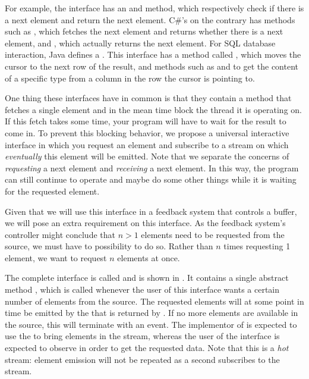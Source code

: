 For example, the \itr interface has an  and  method, which respectively check if there is a next element and return the next element. C\#'s \ier on the contrary has methods such as , which fetches the next element and returns whether there is a next element, and , which actually returns the next element. For SQL database interaction, Java defines a . This interface has a method called , which moves the cursor to the next row of the result, and methods such as  and  to get the content of a specific type from a column in the row the cursor is pointing to.

One thing these interfaces have in common is that they contain a method that fetches a single element and in the mean time block the thread it is operating on. If this fetch takes some time, your program will have to wait for the result to come in. To prevent this blocking behavior, we propose a universal interactive interface in which you request an element and subscribe to a stream on which \textit{eventually} this element will be emitted. Note that we separate the concerns of \textit{requesting} a next element and \textit{receiving} a next element. In this way, the program can still continue to operate and maybe do some other things while it is waiting for the requested element.

Given that we will use this interface in a feedback system that controls a buffer, we will pose an extra requirement on this interface. As the feedback system's controller might conclude that $n > 1$ elements need to be requested from the source, we must have to possibility to do so. Rather than $n$ times requesting 1 element, we want to request $n$ elements at once.

The complete interface is called  and is shown in . It contains a single abstract method , which is called whenever the user of this interface wants a certain number of elements from the source. The requested elements will at some point in time be emitted by the \obs that is returned by . If no more elements are available in the source, this \obs will terminate with an  event. The implementor of  is expected to use the  to bring elements in the stream, whereas the user of the interface is expected to observe  in order to get the requested data. Note that this is a \emph{hot} stream: element emission will not be repeated as a second \obv subscribes to the stream.

